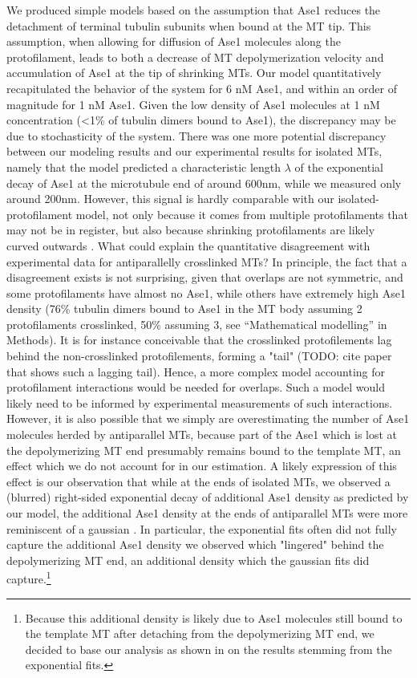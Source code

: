 We produced simple models based on the assumption that Ase1 reduces the detachment of terminal tubulin subunits when bound at the MT tip. This assumption, when allowing for diffusion of Ase1 molecules along the protofilament, leads to both a decrease of MT depolymerization velocity and accumulation of Ase1 at the tip of shrinking MTs. Our model quantitatively recapitulated the behavior of the system for 6 nM Ase1, and within an order of magnitude for 1 nM Ase1. Given the low density of Ase1 molecules at 1 nM concentration (<1\% of tubulin dimers bound to Ase1), the discrepancy may be due to stochasticity of the system. There was one more potential discrepancy between our modeling results and our experimental results for isolated MTs, namely that the model predicted a characteristic length $\lambda$ of the exponential decay of Ase1 at the microtubule end of around 600nm, while we measured only around 200nm. However, this signal is hardly comparable with our isolated-protofilament model, not only because it comes from multiple protofilaments that may not be in register, but also because shrinking protofilaments are likely curved outwards \parencite{McIntosh2008}. What could explain the quantitative disagreement with experimental data for antiparallelly crosslinked MTs? In principle, the fact that a disagreement exists is not surprising, given that overlaps are not symmetric, and some protofilaments have almost no Ase1, while others have extremely high Ase1 density (76\% tubulin dimers bound to Ase1 in the MT body assuming 2 protofilaments crosslinked, 50\% assuming 3, see “Mathematical modelling” in Methods). It is for instance conceivable that the crosslinked protofilements lag behind the non-crosslinked protofilements, forming a "tail" (TODO: cite paper that shows such a lagging tail). Hence, a more complex model accounting for protofilament interactions would be needed for overlaps. Such a model would likely need to be informed by experimental measurements of such interactions. However, it is also possible that we simply are overestimating the number of Ase1 molecules herded by antiparallel MTs, because part of the Ase1 which is lost at the depolymerizing MT end presumably remains bound to the template MT, an effect which we do not account for in our estimation. A likely expression of this effect is our observation that while at the ends of isolated MTs, we observed a (blurred) right-sided exponential decay of additional Ase1 density as predicted by our model, the additional Ase1 density at the ends of antiparallel MTs were more reminiscent of a gaussian . In particular, the exponential fits often did not fully capture the additional Ase1 density we observed which "lingered" behind the depolymerizing MT end, an additional density which the gaussian fits did capture.\footnote{Because this additional density is likely due to Ase1 molecules still bound to the template MT after detaching from the depolymerizing MT end, we decided to base our analysis as shown in  on the results stemming from the exponential fits.} 
